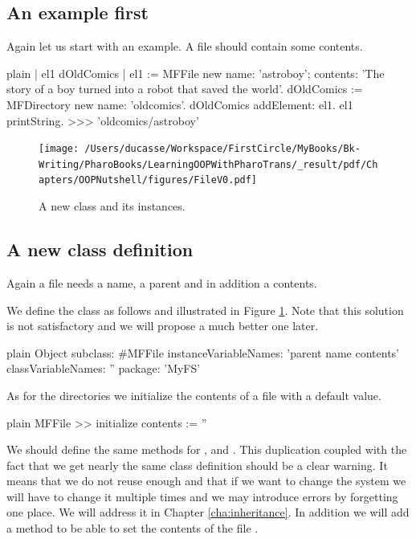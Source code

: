 \documentclass[10pt,twoside,english]{_support/latex/sbabook/sbabook}
\begin{document}
\subsection{An example first}
Again let us start with an example.  A file should contain some contents. 

\begin{displaycode}{plain}
| el1 dOldComics |
el1 := MFFile new name: 'astroboy'; contents: 'The story of a boy turned into a robot that saved the world'.
dOldComics := MFDirectory new name: 'oldcomics'.
dOldComics addElement: el1. 
el1 printString.
>>>
'oldcomics/astroboy'
\end{displaycode}


\begin{figure}

\begin{center}
\texttt{[image: /Users/ducasse/Workspace/FirstCircle/MyBooks/Bk-Writing/PharoBooks/LearningOOPWithPharoTrans/\_result/pdf/Chapters/OOPNutshell/figures/FileV0.pdf]}\caption{A new class and its instances.\label{FileV0}}\end{center}
\end{figure}

\subsection{A new class definition}
Again a file needs a name, a parent and in addition a contents.

We define the class  as follows and illustrated in Figure \ref{FileV0}.
Note that this solution is not satisfactory and we will propose a much better one later.

\begin{displaycode}{plain}
Object subclass: #MFFile
	instanceVariableNames: 'parent name contents'
	classVariableNames: ''
	package: 'MyFS'
\end{displaycode}

As for the directories we initialize the contents of a file with a default value. 

\begin{displaycode}{plain}
MFFile >> initialize
	contents := ''
\end{displaycode}

We should define the same methods for ,  and . This duplication coupled with the fact that we get nearly the same class definition should be a clear warning. It means that we do not reuse enough and that if we want to change the system we will have to change it multiple times and we may introduce errors by forgetting one place. 
We will address it in Chapter \ref{cha:inheritance}. In addition we will add a method to be able to set the contents of the file .
\end{document}
